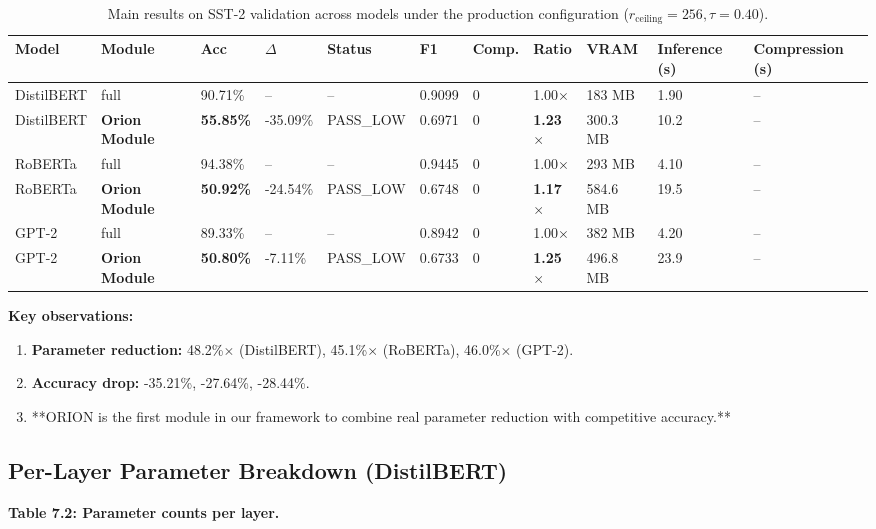 \begin{table}[t]
\centering
\small
\begin{tabular}{lllllllllll}
\toprule
\textbf{Model} & \textbf{Module} & \textbf{Acc} & \textbf{$\Delta$} & \textbf{Status} & \textbf{F1} & \textbf{Comp.} & \textbf{Ratio} & \textbf{VRAM} & \textbf{Inference (s)} & \textbf{Compression (s)} \\
\midrule
DistilBERT & full & 90.71\% & -- & -- & 0.9099 & 0 & 1.00$\times$ & 183 MB & 1.90 & -- \\
DistilBERT & \textbf{Orion Module} & \textbf{55.85\%} & -35.09\% & PASS\_LOW & 0.6971 & 0 & \textbf{1.23$\times$} & 300.3 MB & 10.2 & -- \\
RoBERTa & full & 94.38\% & -- & -- & 0.9445 & 0 & 1.00$\times$ & 293 MB & 4.10 & -- \\
RoBERTa & \textbf{Orion Module} & \textbf{50.92\%} & -24.54\% & PASS\_LOW & 0.6748 & 0 & \textbf{1.17$\times$} & 584.6 MB & 19.5 & -- \\
GPT-2 & full & 89.33\% & -- & -- & 0.8942 & 0 & 1.00$\times$ & 382 MB & 4.20 & -- \\
GPT-2 & \textbf{Orion Module} & \textbf{50.80\%} & -7.11\% & PASS\_LOW & 0.6733 & 0 & \textbf{1.25$\times$} & 496.8 MB & 23.9 & -- \\
\bottomrule
\end{tabular}
\caption{Main results on SST-2 validation across models under the production configuration ($r_{\mathrm{ceiling}}=256, \tau=0.40$).}
\label{tab:main_sst2}
\end{table}

\textbf{Key observations:}

\begin{enumerate}
\item \textbf{Parameter reduction:} 48.2\%$\times$ (DistilBERT), 45.1\%$\times$ (RoBERTa),
  46.0\%$\times$ (GPT-2).
\item \textbf{Accuracy drop:} -35.21\%, -27.64\%, -28.44\%.
\item **ORION is the first module in our framework to combine real parameter
  reduction with competitive accuracy.**

\end{enumerate}
\subsection{Per-Layer Parameter Breakdown (DistilBERT)}

\textbf{Table 7.2: Parameter counts per layer.}

